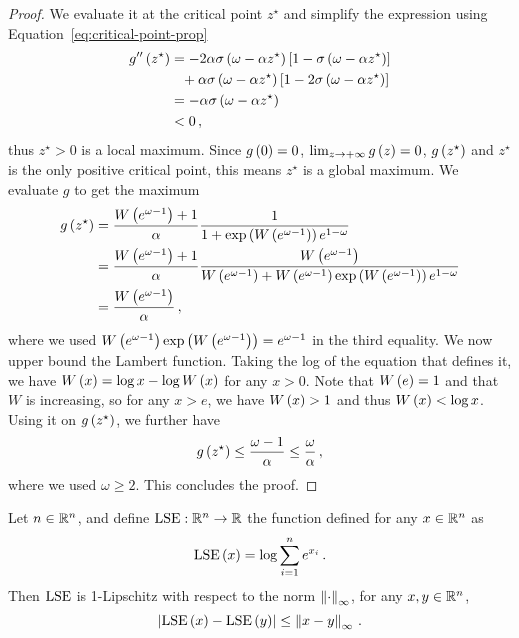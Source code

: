 \begin{proof}
  We evaluate it at the critical point $z^\star$ and simplify the expression using Equation~\ref{eq:critical-point-prop}
  \begin{align*}
    g'' \left( z^\star \right) &= - 2 \alpha \sigma \left( \omega - \alpha z^\star \right) \left[ 1 - \sigma \left( \omega - \alpha z^\star \right) \right] \\
    &\phantom{=}+ \alpha \sigma \left( \omega - \alpha z^\star \right) \left[ 1 - 2 \sigma \left( \omega - \alpha z^\star \right) \right] \\
    &= - \alpha \sigma \left( \omega - \alpha z^\star \right) \\
    &< 0\,,
  \end{align*}
  thus $z^\star > 0$ is a local maximum. Since $g \left( 0 \right) = 0$, $\lim_{z \rightarrow + \infty} g \left( z \right) = 0$, $g \left( z^\star \right)$ and $z^\star$ is the only positive critical point, this means $z^\star$ is a global maximum. We evaluate $g$ to get the maximum
  \begin{align*}
    g \left( z^\star \right) &= \frac{W \left( e^{\omega - 1} \right) + 1}{\alpha} \frac{1}{1 + \exp \left( W \left( e^{\omega - 1} \right) \right) e^{1 - \omega}} \\
    &= \frac{W \left( e^{\omega - 1} \right) + 1}{\alpha} \frac{W \left( e^{\omega - 1} \right)}{W \left( e^{\omega - 1} \right) + W \left( e^{\omega - 1} \right) \exp \left( W \left( e^{\omega - 1} \right) \right) e^{1 - \omega}} \\
    &= \frac{W \left( e^{\omega - 1} \right)}{\alpha}\,,
  \end{align*}
  where we used $W \left( e^{\omega - 1} \right) \exp \left( W \left( e^{\omega - 1} \right) \right) = e^{\omega - 1}$ in the third equality. We now upper bound the Lambert function. Taking the log of the equation that defines it, we have $W \left( x \right) = \log x - \log W \left( x \right)$ for any $x > 0$. Note that $W \left( e \right) = 1$ and that $W$ is increasing, so for any $x > e$, we have $W \left( x \right) > 1$ and thus $W \left( x \right) < \log x$. Using it on $g \left( z^\star \right)$, we further have
  \begin{equation*}
    g \left( z^\star \right) \leq \frac{\omega - 1}{\alpha} \leq \frac{\omega}{\alpha}\,,
  \end{equation*}
  where we used $\omega \geq 2$. This concludes the proof.
\end{proof}


\begin{lemma} \label{lem:lse-lipschitz}
  Let $n \in \mathbb{R}^n$, and define $\operatorname{LSE}: \mathbb{R}^n \rightarrow \mathbb{R}$ the function defined for any $x \in \mathbb{R}^n$ as
  \begin{equation*}
    \operatorname{LSE} \left( x \right) = \log \sum_{i=1}^n e^{x_i}\,.
  \end{equation*}
  Then $\operatorname{LSE}$ is 1-Lipschitz with respect to the norm $\left\|\cdot\right\|_\infty$, \ie for any $x, y \in \mathbb{R}^n$,
  \begin{equation*}
    \left|\operatorname{LSE} \left( x \right) - \operatorname{LSE} \left( y \right)\right| \leq \left\|x - y\right\|_\infty\,.
  \end{equation*}
\end{lemma}

